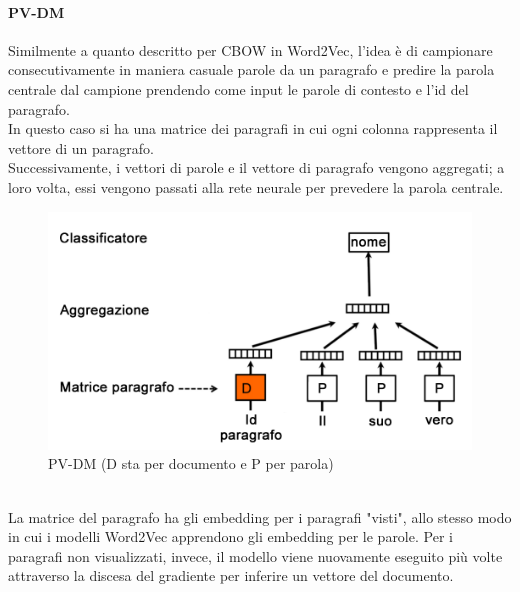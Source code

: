 \documentclass[12pt]{report}
\theoremstyle{definition}
\begin{document}
\paragraph{PV-DM} Similmente a quanto descritto per CBOW in Word2Vec, l'idea è di campionare consecutivamente in maniera casuale parole da un paragrafo e predire la parola centrale dal campione prendendo come input le parole di contesto e l'id del paragrafo.
\\
In questo caso si ha una matrice dei paragrafi in cui ogni colonna rappresenta il vettore di un paragrafo. 
\\
Successivamente, i vettori di parole e il vettore di paragrafo vengono aggregati; a loro volta, essi vengono passati alla rete neurale per prevedere la parola centrale.
\\
\begin{figure}[!h]
    \centering
    \includegraphics[scale = 0.3]{images/pvdm.png}
    \caption{PV-DM (D sta per documento e P per parola)}
    \label{pvdm}
\end{figure}
\\
La matrice del paragrafo ha gli embedding per i paragrafi "visti", allo stesso modo in cui i modelli Word2Vec apprendono gli embedding per le parole. Per i paragrafi non visualizzati, invece, il modello viene nuovamente eseguito più volte attraverso la discesa del gradiente per inferire un vettore del documento. 
\end{document}

